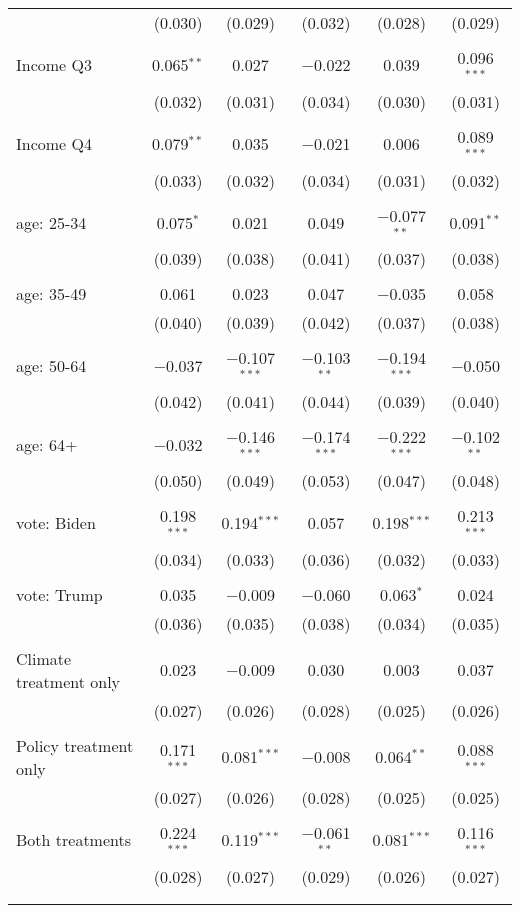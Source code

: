 \begin{tabular}{@{\extracolsep{5pt}}lccccc}
  & (0.030) & (0.029) & (0.032) & (0.028) & (0.029) \\ 
  & & & & & \\ 
 Income Q3 & 0.065$^{**}$ & 0.027 & $-$0.022 & 0.039 & 0.096$^{***}$ \\ 
  & (0.032) & (0.031) & (0.034) & (0.030) & (0.031) \\ 
  & & & & & \\ 
 Income Q4 & 0.079$^{**}$ & 0.035 & $-$0.021 & 0.006 & 0.089$^{***}$ \\ 
  & (0.033) & (0.032) & (0.034) & (0.031) & (0.032) \\ 
  & & & & & \\ 
 age: 25-34 & 0.075$^{*}$ & 0.021 & 0.049 & $-$0.077$^{**}$ & 0.091$^{**}$ \\ 
  & (0.039) & (0.038) & (0.041) & (0.037) & (0.038) \\ 
  & & & & & \\ 
 age: 35-49 & 0.061 & 0.023 & 0.047 & $-$0.035 & 0.058 \\ 
  & (0.040) & (0.039) & (0.042) & (0.037) & (0.038) \\ 
  & & & & & \\ 
 age: 50-64 & $-$0.037 & $-$0.107$^{***}$ & $-$0.103$^{**}$ & $-$0.194$^{***}$ & $-$0.050 \\ 
  & (0.042) & (0.041) & (0.044) & (0.039) & (0.040) \\ 
  & & & & & \\ 
 age: 64+ & $-$0.032 & $-$0.146$^{***}$ & $-$0.174$^{***}$ & $-$0.222$^{***}$ & $-$0.102$^{**}$ \\ 
  & (0.050) & (0.049) & (0.053) & (0.047) & (0.048) \\ 
  & & & & & \\ 
 vote: Biden & 0.198$^{***}$ & 0.194$^{***}$ & 0.057 & 0.198$^{***}$ & 0.213$^{***}$ \\ 
  & (0.034) & (0.033) & (0.036) & (0.032) & (0.033) \\ 
  & & & & & \\ 
 vote: Trump & 0.035 & $-$0.009 & $-$0.060 & 0.063$^{*}$ & 0.024 \\ 
  & (0.036) & (0.035) & (0.038) & (0.034) & (0.035) \\ 
  & & & & & \\ 
 Climate treatment only & 0.023 & $-$0.009 & 0.030 & 0.003 & 0.037 \\ 
  & (0.027) & (0.026) & (0.028) & (0.025) & (0.026) \\ 
  & & & & & \\ 
 Policy treatment only & 0.171$^{***}$ & 0.081$^{***}$ & $-$0.008 & 0.064$^{**}$ & 0.088$^{***}$ \\ 
  & (0.027) & (0.026) & (0.028) & (0.025) & (0.025) \\ 
  & & & & & \\ 
 Both treatments & 0.224$^{***}$ & 0.119$^{***}$ & $-$0.061$^{**}$ & 0.081$^{***}$ & 0.116$^{***}$ \\ 
  & (0.028) & (0.027) & (0.029) & (0.026) & (0.027) \\ 
  & & & & & \\ 
\hline \\[-1.8ex] 


\end{tabular}

